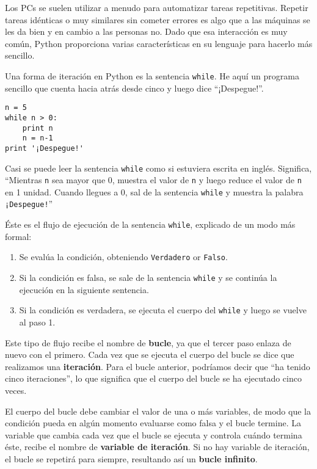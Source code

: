 Los PCs se suelen utilizar a menudo para automatizar tareas repetitivas. Repetir
tareas idénticas o muy similares sin cometer errores es algo que a las
máquinas se les da bien y en cambio a las personas no.
Dado que esa interacción es muy común, Python proporciona varias
características en su lenguaje para hacerlo más sencillo.

Una forma de iteración en Python es la sentencia {\tt while}. He aquí un
programa sencillo que cuenta hacia atrás desde cinco y luego dice ``¡Despegue!''.

\beforeverb
\begin{verbatim}
n = 5
while n > 0:
    print n
    n = n-1
print '¡Despegue!'
\end{verbatim}
\afterverb
%
Casi se puede leer la sentencia {\tt while} como si estuviera escrita en inglés.
Significa, ``Mientras {\tt n} sea mayor que 0,
muestra el valor de {\tt n} y luego reduce el valor de {\tt n}
en 1 unidad. Cuando llegues a 0, sal de la sentencia {\tt while} y
muestra la palabra {\tt ¡Despegue!}''


Éste es el flujo de ejecución de la sentencia {\tt while}, explicado de un modo más formal:

\begin{enumerate}

\item Se evalúa la condición, obteniendo {\tt Verdadero} or {\tt Falso}.

\item Si la condición es falsa, se sale de la sentencia {\tt while}
y se continúa la ejecución en la siguiente sentencia.

\item Si la condición es verdadera, se ejecuta el
cuerpo del {\tt while} y luego se vuelve al paso 1.

\end{enumerate}

Este tipo de flujo recibe el nombre de {\bf bucle}, ya que el tercer paso
enlaza de nuevo con el primero. Cada vez que se ejecuta el cuerpo del
bucle se dice que realizamos una {\bf iteración}. Para el bucle anterior,
podríamos decir que ``ha tenido cinco iteraciones'', lo que significa que el cuerpo
del bucle se ha ejecutado cinco veces.


El cuerpo del bucle debe cambiar el valor de una o más variables,
de modo que la condición pueda en algún momento evaluarse como falsa
y el bucle termine.
La variable que cambia cada vez que el bucle se ejecuta
y controla cuándo termina éste, recibe el nombre de
{\bf variable de iteración}.
Si no hay variable de iteración, el bucle se repetirá para siempre,
resultando así un {\bf bucle infinito}.

